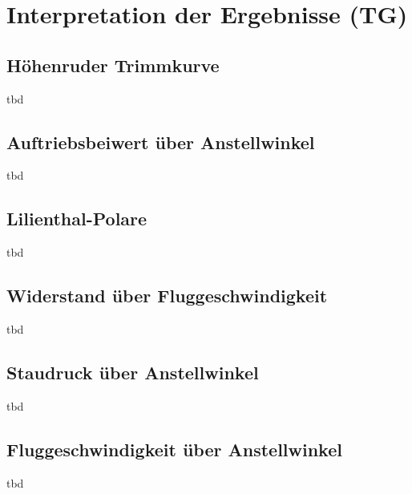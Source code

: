 \chapter{Interpretation der Ergebnisse (TG)}

\section{Höhenruder Trimmkurve}
tbd

\section{Auftriebsbeiwert über Anstellwinkel}
tbd

\section{Lilienthal-Polare}
tbd

\section{Widerstand über Fluggeschwindigkeit}
tbd

\section{Staudruck über Anstellwinkel}
tbd

\section{Fluggeschwindigkeit über Anstellwinkel}
tbd